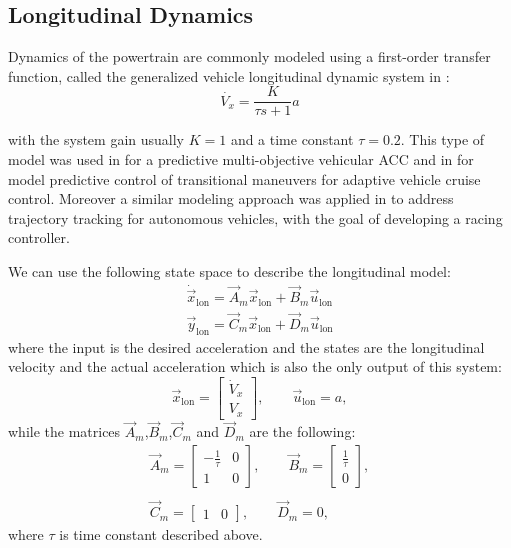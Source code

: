 \subsection{Longitudinal Dynamics}
Dynamics of the powertrain are commonly modeled using a first-order transfer function, called the generalized vehicle longitudinal dynamic system in \cite{longitudinal_paper}:
\begin{equation}
\label{eqn:longitudinal_transfer_function}
\dot{V_x} = \frac{K}{\tau s+1}a
\end{equation}

with the system gain usually $K = 1$ and a time constant $\tau = 0.2$. This type of model was used in \cite{longitudinal_paper} for a predictive multi-objective vehicular ACC and in \cite{longitudinal_paper2} for model predictive control of transitional maneuvers for adaptive
vehicle cruise control. Moreover a similar modeling approach
was applied in \cite{longitudinal} to address trajectory tracking for autonomous vehicles, with the goal of developing a racing controller.

We can use the following state space to describe the longitudinal model:
\begin{equation}
\label{eqn:longi_dynamics_simple_model_ss}
\begin{array}{ll}
\dot{\vec{x}}_{\text{lon}} =\vec{A}_m \vec{x}_{\text{lon}}+ \vec{B}_m\vec{u}_{\text{lon}}\\
\vec{y}_{\text{lon}} =\vec{C}_m \vec{x}_{\text{lon}} + \vec{D}_m \vec{u}_{\text{lon}}
\end{array}
\end{equation}
where the input is the desired acceleration and the states are the longitudinal velocity and the actual acceleration which is also the only output of this system:
\begin{equation}
\vec{x}_{\text{lon}} = \begin{bmatrix}
\dot{V}_x\\V_x
\end{bmatrix},
\qquad
\vec{u}_{\text{lon}} = a,
\end{equation}
while the matrices $\vec{A}_m$,$\vec{B}_m$,$\vec{C}_m$ and $\vec{D}_m$ are the following:
\begin{equation}
\begin{array}{cc}
\vec{A}_m=\begin{bmatrix}
-\frac{1}{\tau}&0\\1&0
\end{bmatrix},
\qquad
\vec{B}_m=\begin{bmatrix}
\frac{1}{\tau}\\
0
\end{bmatrix},\\\\
\vec{C}_m=\begin{bmatrix}
1&0
\end{bmatrix}, 
\qquad
\vec{D}_m=0,
\end{array}
\end{equation}
where $\tau$ is time constant described above. 

